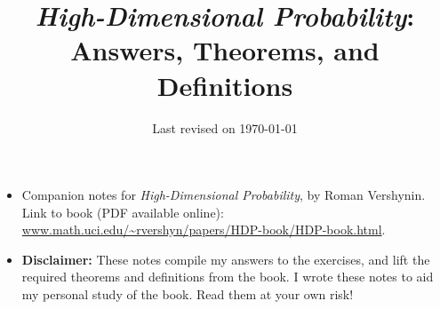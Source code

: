 \documentclass[11pt, oneside]{article}
\begin{document}
\title{\textit{High-Dimensional Probability}: Answers, Theorems, and Definitions}
\author{}
\date{\vspace{-3ex}Last revised on \today}

\maketitle
\vspace{-10pt}

\begin{itemize}
\item Companion notes for \textit{High-Dimensional Probability}, by Roman Vershynin. Link to book (PDF available online): \url{www.math.uci.edu/~rvershyn/papers/HDP-book/HDP-book.html}.
\item \textbf{Disclaimer:} These notes compile my answers to the exercises, and lift the required theorems and definitions from the book. I wrote these notes to aid my personal study of the book. Read them at your own risk!
\end{itemize}

\setcounter{section}{-1}
\tableofcontents

\newpage




\end{document}
